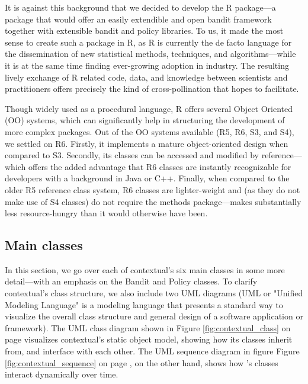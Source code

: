\documentclass[nojss]{jss}\usepackage[]{graphicx}\usepackage[]{color}
\begin{document}
It is against this background that we decided to develop the  R package---a package that would offer an easily extendible and open bandit framework together with extensible bandit and policy libraries. To us, it made the most sense to create such a package in R, as R is currently the de facto language for the dissemination of new statistical methods, techniques, and algorithms---while it is at the same time finding ever-growing adoption in industry. The resulting lively exchange of R related code, data, and knowledge between scientists and practitioners offers precisely the kind of cross-pollination that  hopes to facilitate.

Though widely used as a procedural language, R offers several Object Oriented (OO) systems, which can significantly help in structuring the development of more complex packages. Out of the OO systems available (R5, R6, S3, and S4), we settled on R6. Firstly, it implements a mature object-oriented design when compared to S3. Secondly, its classes can be accessed and modified by reference---which offers the added advantage that R6 classes are instantly recognizable for developers with a background in Java or C++. Finally, when compared to the older R5 reference class system, R6 classes are lighter-weight and (as they do not make use of S4 classes) do not require the methods package---makes  substantially less resource-hungry than it would otherwise have been.

\subsection{Main classes}

In this section, we go over each of contextual's six main classes in some more detail---with an emphasis on the Bandit and Policy classes. To clarify contextual's class structure, we also include two UML diagrams (UML or "Unified Modeling Language" is a modeling language that presents a standard way to visualize the overall class structure and general design of a software application or framework). The UML class diagram shown in Figure \ref{fig:contextual_class} on page \pageref{fig:contextual_class} visualizes contextual's static object model, showing how its classes inherit from, and interface with each other. The UML sequence diagram in figure Figure \ref{fig:contextual_sequence} on page \pageref{fig:contextual_sequence}, on the other hand, shows how 's classes interact dynamically over time.
\end{document}
